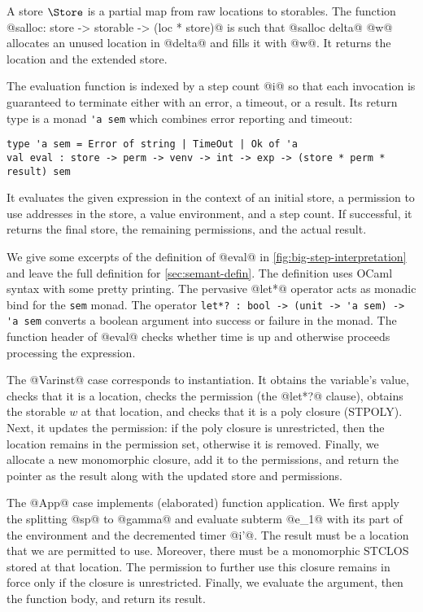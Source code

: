 A store $\Store$ is a partial map from raw locations to
storables. The function
@salloc: store -> storable -> (loc * store)@ is such that
@salloc delta@ @w@ allocates an unused location in @delta@ and fills it with
@w@. It returns the location and the extended store.


The evaluation function is indexed by a step count @i@ so that each
invocation is guaranteed to terminate either with an error, a timeout,
or a result. Its return type is a monad
\lstinline/'a sem/ which combines error reporting and timeout:
\begin{lstlisting}
type 'a sem = Error of string | TimeOut | Ok of 'a
val eval : store -> perm -> venv -> int -> exp -> (store * perm * result) sem
\end{lstlisting}
It evaluates the given expression in the context of an initial store, a
permission to use addresses in the store, a value environment, and a
step count. If successful, it returns the final store, the remaining
permissions, and the actual result.



We give some excerpts of the definition of @eval@ in
\cref{fig:big-step-interpretation} and leave the full
definition for \cref{sec:semant-defin}.
The definition uses OCaml syntax with some pretty
printing. The pervasive @let*@ operator acts as monadic bind
for the \lstinline/sem/ monad. The operator
\lstinline/let*? : bool -> (unit -> 'a sem) -> 'a sem/
 converts a boolean
argument into success or failure in the monad.
 The function header of @eval@ checks
whether time is up and otherwise proceeds processing the expression.

The @Varinst@ case corresponds to instantiation. It
obtains the variable's value, checks that it is a location, checks the
permission (the @let*?@ clause), obtains the storable $w$ at that
location, and checks that it is a poly closure (STPOLY). Next, it updates the
permission: if the poly closure is unrestricted, then the location
remains in the permission set, otherwise it is removed. Finally, we
allocate a new monomorphic closure, add it to the permissions, and
return the pointer as the result along with the updated store and
permissions.

The @App@ case implements (elaborated) function application.
We first apply the splitting @sp@ to @gamma@ and
evaluate subterm @e_1@ with its part of the environment and the
decremented timer @i'@. The result must be a location that we are
permitted to use. Moreover, there must be a monomorphic STCLOS stored
at that location. The permission to further use this closure  remains
in force only if the closure is unrestricted. Finally, we evaluate the
argument, then the function body, and return its result.

